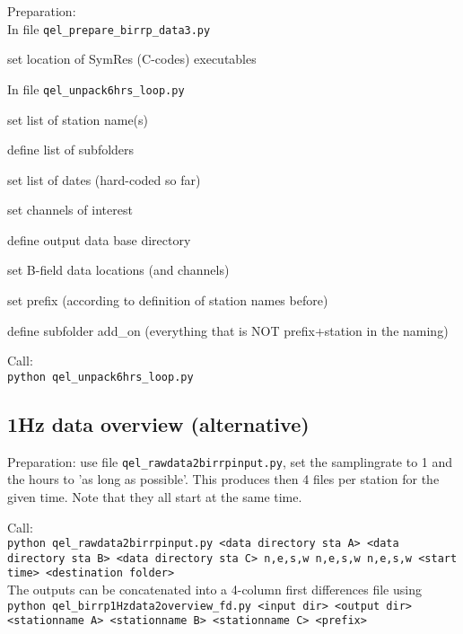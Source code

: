 \documentclass[11pt,DIV=12]{scrartcl}
\begin{document}
Preparation:\\
In file \texttt{qel\_prepare\_birrp\_data3.py}
\begin{itemize*}
\item set location of SymRes (C-codes) executables
\end{itemize*}

In file \texttt{qel\_unpack6hrs\_loop.py}
\begin{itemize*}
\item set list of station name(s)
\item define list of subfolders
\item set list of dates (hard-coded so far)
\item set channels of interest
\item define output data base directory
\item set B-field data locations (and channels)
\item set prefix (according to definition of station names before)
\item define subfolder add\_on (everything that is NOT prefix+station in the naming)
\end{itemize*}

Call:\\

\texttt{python qel\_unpack6hrs\_loop.py}

\subsection{1Hz data overview (alternative)}

Preparation: use file \texttt{qel\_rawdata2birrpinput.py}, set the samplingrate to 1 and the hours to 'as long as possible'. This produces then 4 files per station for the given time. Note that they all start at the same time. 


Call:\\

\texttt{python qel\_rawdata2birrpinput.py <data directory sta A> <data directory sta B> <data directory sta C>  n,e,s,w n,e,s,w n,e,s,w   <start time> <destination folder> }\\

The outputs can be concatenated into a 4-column first differences file using \\

\texttt{python qel\_birrp1Hzdata2overview\_fd.py <input dir> <output dir> <stationname A> <stationname B> <stationname C> <prefix>}
\end{document}
